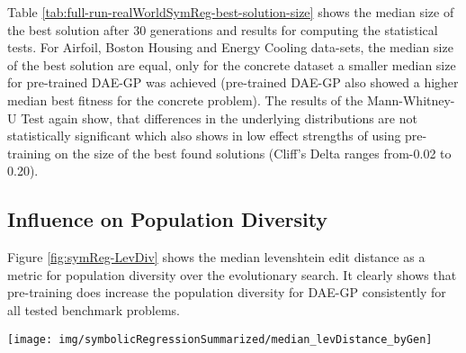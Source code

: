 \documentclass[
  11pt,
]{article}
\let\origfigure\figure
\let\endorigfigure\endfigure
\renewenvironment{figure}[1][2] {
    \expandafter\origfigure\expandafter[H]
} {
    \endorigfigure
}
\begin{document}
Table \ref{tab:full-run-realWorldSymReg-best-solution-size} shows the median size of the best solution after 30 generations and results for computing the statistical tests.
For Airfoil, Boston Housing and Energy Cooling data-sets, the median size of the best solution are equal, only for the concrete dataset a smaller median size for pre-trained DAE-GP was achieved (pre-trained DAE-GP also showed a higher median best fitness for the concrete problem).
The results of the Mann-Whitney-U Test again show, that differences in the underlying distributions are not statistically significant which also shows in low effect strengths of using pre-training on the size of the best found solutions (Cliff's Delta ranges from-0.02 to 0.20).

\hypertarget{influence-on-population-diversity}{%
\subsection{Influence on Population Diversity}\label{influence-on-population-diversity}}

Figure \ref{fig:symReg-LevDiv} shows the median levenshtein edit distance as a metric for population diversity over the evolutionary search.
It clearly shows that pre-training does increase the population diversity for DAE-GP consistently for all tested benchmark problems.

\begin{figure}[c]

{\centering \texttt{[image: img/symbolicRegressionSummarized/median\_levDistance\_byGen]} 

}

\caption{Population Diversity over 30 Generations - Real World Symbolic Regression}\label{fig:symReg-LevDiv}
\end{figure}
\end{document}
